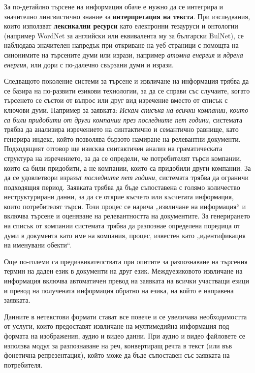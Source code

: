 \documentclass[]{../../metanetpaper}
\begin{document}
\begin{multicols}{2}
За по-детайлно търсене на информация обаче е нужно да
 се интегрира и значително лингвистично знание за \textbf{интерпретация на текста}. 
При изследвания, които използват \textbf{лексикални ресурси} като електронни тезауруси и онтологии (например WordNet за английски или еквивалента му за български BulNet), се наблюдава значителен напредък при откриване на уеб
 страници с помощта на синонимите на търсените думи или изрази, например {\it атомна енергия} и {\it ядрена енергия}, или дори с по-далечно свързани думи и изрази.


Следващото поколение системи за търсене и извличане на информация трябва да се базира на
 по-развити езикови технологии, за да се справи със случаите, когато търсенето се състои от въпрос или друг вид изречение вместо от списък с ключови думи. 
 Например за заявката: \textit{Искам списъка на всички компании, които
 са били придобити от други компании през последните пет
 години}, системата трябва да анализира  изречението на синтактично и семантично равнище, като генерира индекс, който позволява бързото намиране на релевантни документи. Подходящият отговор ще изисква синтактичен анализ на граматическата структура на изречението, за да се определи, че потребителят търси компании, които са били придобити, а не компании, които са придобили
 други компании. За да се удовлетвори изразът \textit{последните пет години}, системата трябва да ограничи подходящия период. Заявката трябва да бъде съпоставена с голямо количество неструктурирани данни, за да се
 открие късчето или късчетата информация, които потребителят търси. Този процес се нарича „извличане на информация“ и включва търсене и оценяване на релевантността на  документите. За генерирането на списък от компании системата трябва да разпознае определена поредица от думи
 в документа като име на компания, процес, известен като „идентификация на
 именувани обекти“.

Още по-големи са предизвикателствата при опитите за разпознаване на търсения термин на даден език в документи на друг език. Междуезиковото извличане на информация включва автоматичен превод на заявката
 на всички участващи езици и превод на получената информация обратно на езика, на който е направена заявката.

Данните в нетекстови формати стават все повече и се увеличава необходимостта от услуги, които предоставят извличане на мултимедийна информация под
 формата на изображения, аудио и видео данни. При аудио и видео файловете се използва модул за разпознаване
 на реч, конвертиращ речта в текст (или във
 фонетична репрезентация), който може да бъде
 съпоставен със заявката на потребителя.
 

\end{multicols}
\end{document}
